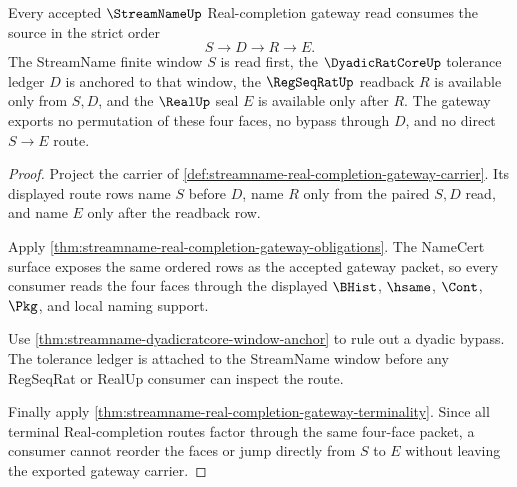 \begin{theorem}
\label{thm:streamname-real-completion-gateway-ordered-source-readback}
Every accepted $\StreamNameUp$ Real-completion gateway read consumes the source in the strict order
$$
S \longrightarrow D \longrightarrow R \longrightarrow E .
$$
The StreamName finite window $S$ is read first, the $\DyadicRatCoreUp$ tolerance ledger $D$ is anchored to that window, the $\RegSeqRatUp$ readback $R$ is available only from $S,D$, and the $\RealUp$ seal $E$ is available only after $R$. The gateway exports no permutation of these four faces, no bypass through $D$, and no direct $S \longrightarrow E$ route.
\end{theorem}
\begin{proof}
Project the carrier of \autoref{def:streamname-real-completion-gateway-carrier}. Its displayed route rows name $S$ before $D$, name $R$ only from the paired $S,D$ read, and name $E$ only after the readback row.

Apply \autoref{thm:streamname-real-completion-gateway-obligations}. The NameCert surface exposes the same ordered rows as the accepted gateway packet, so every consumer reads the four faces through the displayed $\BHist$, $\hsame$, $\Cont$, $\Pkg$, and local naming support.

Use \autoref{thm:streamname-dyadicratcore-window-anchor} to rule out a dyadic bypass. The tolerance ledger is attached to the StreamName window before any RegSeqRat or RealUp consumer can inspect the route.

Finally apply \autoref{thm:streamname-real-completion-gateway-terminality}. Since all terminal Real-completion routes factor through the same four-face packet, a consumer cannot reorder the faces or jump directly from $S$ to $E$ without leaving the exported gateway carrier.
\end{proof}

